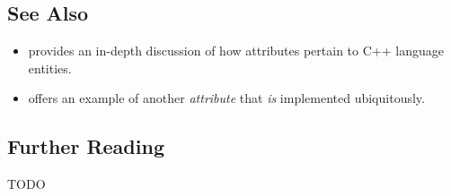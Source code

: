 \subsection[See Also]{See Also}\label{see-also}

\begin{itemize}
\item{%
provides an in-depth discussion of how attributes pertain to C++ language entities.}
\item{%
offers an example of another \emph{attribute} that \emph{is} implemented ubiquitously.}
\end{itemize}

\subsection[Further Reading]{Further Reading}\label{further-reading}

TODO


